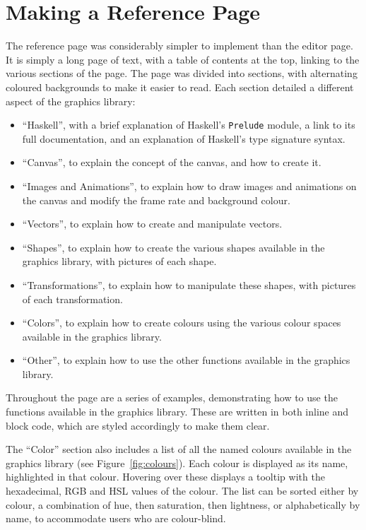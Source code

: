 \documentclass[../main.tex]{subfiles}
\begin{document}
    \section{Making a Reference Page}
        The reference page was considerably simpler to implement than the editor page.
        It is simply a long page of text, with a table of contents at the top, linking
            to the various sections of the page.
        The page was divided into sections, with alternating coloured backgrounds to
            make it easier to read.
        Each section detailed a different aspect of the graphics library:
        \begin{itemize}
            \item ``Haskell'', with a brief explanation of Haskell's \texttt{Prelude} module,
                  a link to its full documentation, and an explanation of Haskell's type
                  signature syntax.
            \item ``Canvas'', to explain the concept of the canvas, and how to create it.
            \item ``Images and Animations'', to explain how to draw images and animations on the
                  canvas and modify the frame rate and background colour.
            \item ``Vectors'', to explain how to create and manipulate vectors.
            \item ``Shapes'', to explain how to create the various shapes available in the
                  graphics library, with pictures of each shape.
            \item ``Transformations'', to explain how to manipulate these shapes, with pictures
                  of each transformation.
            \item ``Colors'', to explain how to create colours using the various colour spaces
                  available in the graphics library.
            \item ``Other'', to explain how to use the other functions available in the graphics
                  library.
        \end{itemize}

        Throughout the page are a series of examples, demonstrating how to use the
            functions available in the graphics library.
        These are written in both inline and block code, which are styled accordingly
            to make them clear.

        The ``Color'' section also includes a list of all the named colours available
            in the graphics library (see Figure~\ref{fig:colours}).
        Each colour is displayed as its name, highlighted in that colour.
        Hovering over these displays a tooltip with the hexadecimal, RGB and HSL values
            of the colour.
        The list can be sorted either by colour, a combination of hue, then saturation,
            then lightness, or alphabetically by name, to accommodate users who are
            colour-blind.
\end{document}

